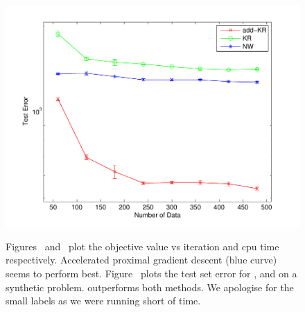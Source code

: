 \begin{figure}
{  \includegraphics[width=\imarrwthree]{figs/toyResults}
  \vspace{\imlabelspace}
  \label{fig:compare}
} \\
\caption[]{ \hspace{-0.1in}
Figures~ and~ plot the objective value vs
iteration and cpu time respectively. Accelerated proximal gradient descent (blue
curve) seems to perform best. Figure~ plots the test set
error for \addkrrs, \krrs and \nws on a synthetic problem. 
\addkrrs outperforms both methods.
We apologise for the small labels as we were running short of time.
}
\label{fig:toythree}
\vspace{\imtextspace}
\end{figure}

